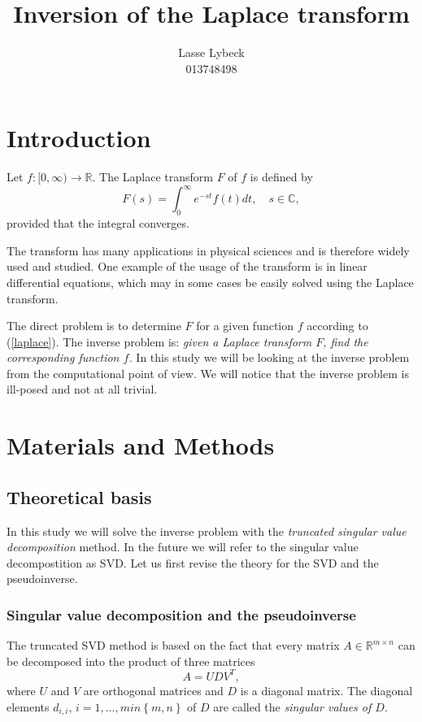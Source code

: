 \documentclass[12pt,a4]{article}
\title{Inversion of the Laplace transform}
\author{Lasse Lybeck\\013748498}
\newcommand{\R}{{\mathbb R}}
\newcommand{\C}{{\mathbb C}}
\begin{document}
\maketitle

\section{Introduction}

Let $f:[0,\infty)\rightarrow \R$. The Laplace transform $F$ of $f$ is defined by
\begin{equation}\label{laplace}
 F(s) = \int_0^\infty e^{-st}f(t)dt,\quad s\in\C ,
\end{equation}
provided that the integral converges.

The transform has many applications in physical sciences and is therefore widely used and studied. One example of the usage of the transform is in linear differential equations, which may in some cases be easily solved using the Laplace transform.

The direct problem is to determine $F$ for a given function $f$ according to (\ref{laplace}). The inverse problem is: {\em given a Laplace transform $F$, find the corresponding function $f$.} In this study we will be looking at the inverse problem from the computational point of view. We will notice that the inverse problem is ill-posed and not at all trivial.




\section{Materials and Methods}\label{sec:methods}

\subsection{Theoretical basis}

In this study we will solve the inverse problem with the \emph{truncated singular value decomposition} method. In the future we will refer to the singular value decompostition as SVD. Let us first revise the theory for the SVD and the pseudoinverse.

\subsubsection{Singular value decomposition and the pseudoinverse}

The truncated SVD method is based on the fact that every matrix $A \in \R^{m \times n}$ can be decomposed into the product of three matrices
\begin{equation}
A = U D V^T,
\end{equation}
where $U$ and $V$ are orthogonal matrices and $D$ is a diagonal matrix. The diagonal elements $d_{i,i}$, $i = 1, \ldots , min \left\{ m,n \right\}$ of $D$ are called the \emph{singular values of $D$}.
\end{document}
